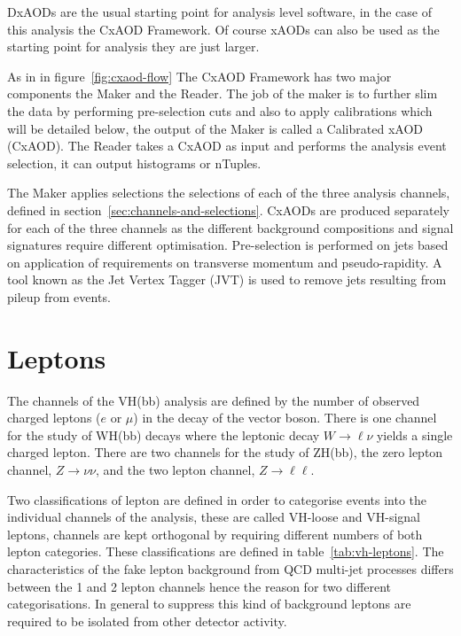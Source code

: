 DxAODs are the usual starting point for analysis level software, in the case of
this analysis the CxAOD Framework. Of course xAODs can also be used as the
starting point for analysis they are just larger.

As in in figure~\ref{fig:cxaod-flow} The CxAOD Framework has two major
components the Maker and the Reader. The job of the maker is to further slim the
data by performing pre-selection cuts and also to apply calibrations which will
be detailed below, the output of the Maker is called a Calibrated xAOD (CxAOD).
The Reader takes a CxAOD as input and performs the analysis event selection, it
can output histograms or nTuples.

The Maker applies selections the selections of each of the three analysis
channels, defined in section~\ref{sec:channels-and-selections}. CxAODs are
produced separately for each of the three channels as the different background
compositions and signal signatures require different optimisation. Pre-selection is
performed on jets based on application of requirements on transverse momentum and
pseudo-rapidity. A tool known as the Jet Vertex Tagger (JVT) is used to remove
jets resulting from pileup from events.

\section{Leptons}%
\label{sec:lepton}

The channels of the VH(bb) analysis are defined by the number of observed
charged leptons ($e$ or $\mu$) in the decay of the vector boson. There is one
channel for the study of WH(bb) decays where the leptonic decay $W \rightarrow
\ell\nu$ yields a single charged lepton. There are two channels for the study of
ZH(bb), the zero lepton channel, $Z \rightarrow \nu\nu$, and the two lepton
channel, $Z \rightarrow \ell\ell$. 

Two classifications of lepton are defined in order to categorise events into the
individual channels of the analysis, these are called VH-loose and VH-signal
leptons, channels are kept orthogonal by requiring different numbers of both
lepton categories. These classifications are defined in
table~\ref{tab:vh-leptons}. The characteristics of the fake lepton background
from QCD multi-jet processes differs between the 1 and 2 lepton channels hence
the reason for two different categorisations. In general to suppress this kind
of background leptons are required to be isolated from other detector activity.


